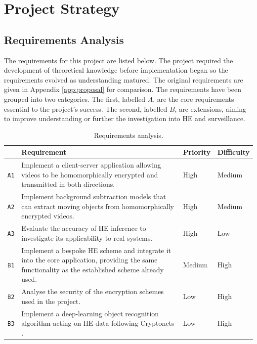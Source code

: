 \section{Project Strategy}
\label{sec:projectStrategy}
\subsection{Requirements Analysis}
\label{sec:requirements}
\indent \indent
The requirements for this project are listed below. The project required the development of theoretical knowledge before implementation began so the requirements evolved as understanding matured. The original requirements are given in Appendix \ref{app:proposal} for comparison. The requirements have been grouped into two categories. The first, labelled $A$, are the core requirements essential to the project's success. The second, labelled $B$, are extensions, aiming to improve understanding or further the investigation into HE and surveillance.
\begin{table}[h!]
    \centering
    \begin{tabular}{|>{\centering\arraybackslash}m{0.5cm}||m{10.9cm}|>{\centering\arraybackslash}m{1.63cm}|>{\centering\arraybackslash}m{1.91cm}|}
        \hline
        & \textrm{\textbf{Requirement}} & \textrm{\textbf{Priority}} & \textrm{\textbf{Difficulty}} \\
        \hline \hline
        \texttt{A1} & \textrm{Implement a client-server application allowing videos to be homomorphically encrypted and transmitted in both directions.} & \color{Red}\textrm{High} & \color{Dandelion}\textrm{Medium} \\
        \hline
        \texttt{A2} & \textrm{Implement background subtraction models that can extract moving objects from homomorphically encrypted videos.} & \color{Red}\textrm{High} & \color{Dandelion}\textrm{Medium} \\
        \hline
        \texttt{A3} & \textrm{Evaluate the accuracy of HE inference to investigate its applicability to real systems.} & \color{Red}\textrm{High} & \color{Green}\textrm{Low} \\
        \hline \hline
        \texttt{B1} & \textrm{Implement a bespoke HE scheme and integrate it into the core application, providing the same functionality as the established scheme already used.} & \color{Dandelion}\textrm{Medium} & \color{Red}\textrm{High} \\
        \hline
        \texttt{B2} & \textrm{Analyse the security of the encryption schemes used in the project.} & \color{Green}\textrm{Low} & \color{Red}\textrm{High} \\
        \hline
        \texttt{B3} & \textrm{Implement a deep-learning object recognition algorithm acting on HE data following Cryptonets \cite{Dowlin}.} & \color{Green}\textrm{Low} & \color{Red}\textrm{High} \\
        \hline
    \end{tabular}%
    \caption[Requirements Analysis]{Requirements analysis.}
\end{table}

